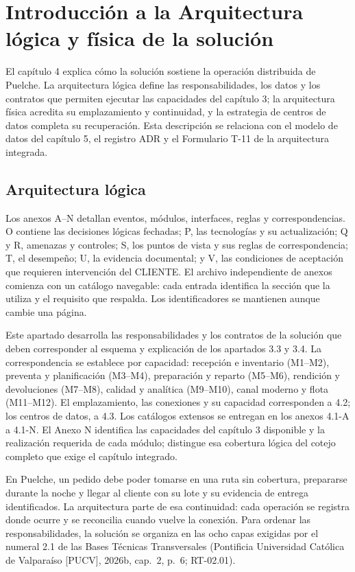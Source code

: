 
\chapter{Introducción a la Arquitectura lógica y física de la solución}
\label{cap:arquitectura-logica}

El capítulo 4 explica cómo la solución sostiene la operación distribuida de Puelche. La arquitectura lógica define las responsabilidades, los datos y los contratos que permiten ejecutar las capacidades del capítulo 3; la arquitectura física acredita su emplazamiento y continuidad, y la estrategia de centros de datos completa su recuperación. Esta descripción se relaciona con el modelo de datos del capítulo 5, el registro ADR y el Formulario T-11 de la arquitectura integrada.

\section{Arquitectura lógica}
\label{sec:arquitectura-logica}

Los anexos A--N detallan eventos, módulos, interfaces, reglas y correspondencias. O contiene las decisiones lógicas fechadas; P, las tecnologías y su actualización; Q y R, amenazas y controles; S, los puntos de vista y sus reglas de correspondencia; T, el desempeño; U, la evidencia documental; y V, las condiciones de aceptación que requieren intervención del CLIENTE. El archivo independiente de anexos comienza con un catálogo navegable: cada entrada identifica la sección que la utiliza y el requisito que respalda. Los identificadores se mantienen aunque cambie una página.

Este apartado desarrolla las responsabilidades y los contratos de la solución que deben corresponder al esquema y explicación de los apartados 3.3 y 3.4. La correspondencia se establece por capacidad: recepción e inventario (M1--M2), preventa y planificación (M3--M4), preparación y reparto (M5--M6), rendición y devoluciones (M7--M8), calidad y analítica (M9--M10), canal moderno y flota (M11--M12). El emplazamiento, las conexiones y su capacidad corresponden a 4.2; los centros de datos, a 4.3. Los catálogos extensos se entregan en los anexos 4.1-A a 4.1-N. El Anexo N identifica las capacidades del capítulo 3 disponible y la realización requerida de cada módulo; distingue esa cobertura lógica del cotejo completo que exige el capítulo integrado.

En Puelche, un pedido debe poder tomarse en una ruta sin cobertura, prepararse durante la noche y llegar al cliente con su lote y su evidencia de entrega identificados. La arquitectura parte de esa continuidad: cada operación se registra donde ocurre y se reconcilia cuando vuelve la conexión. Para ordenar las responsabilidades, la solución se organiza en las ocho capas exigidas por el numeral 2.1 de las Bases Técnicas Transversales (Pontificia Universidad Católica de Valparaíso [PUCV], 2026b, cap.~2, p.~6; RT-02.01).

